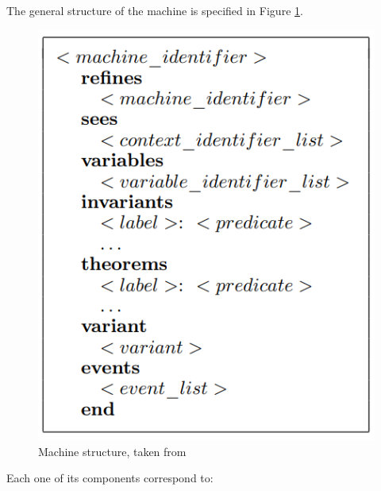 The general structure of the machine is specified in Figure \ref{fig:eventb3}.  
\begin{figure}
    \centering
    \includegraphics[scale = 0.4]{images/eventb3.PNG}
    \caption{Machine structure, taken from \cite{Abrial2011}}
    \label{fig:eventb3}
\end{figure}
Each one of its components correspond to:
